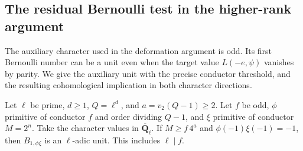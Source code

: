 \subsection{The residual Bernoulli test in the higher-rank argument}

The auxiliary character used in the deformation argument is odd. Its
first Bernoulli number can be a unit even when the target value
\(L(-e,\psi)\) vanishes by parity. We give the auxiliary unit with
the precise conductor threshold, and the resulting cohomological
implication in both character directions.

\begin{theorem}\label{famsel:unit}
Let \(\ell\) be prime, \(d\ge1\), \(Q=\ell^d\), and
\(a=v_2(Q-1)\ge2\). Let \(f\) be odd, \(\phi\) primitive of conductor
\(f\) and order dividing \(Q-1\), and \(\xi\) primitive of conductor
\(M=2^n\). Take the character values in \(\overline{\mathbf Q}_\ell\).
If \(M\ge f\,4^a\) and \(\phi(-1)\xi(-1)=-1\), then
\(B_{1,\phi\xi}\) is an \(\ell\)-adic unit. This includes \(\ell\mid f\).
\end{theorem}
